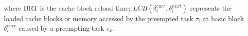 \noindent where BRT is the cache block reload time; \begin{math}\textit{LCB}(\delta_{i}^{curr},\delta_{i}^{next})\end{math} represents the loaded cache blocks or memory accessed by the preempted task \begin{math}\tau_{i}\end{math} at basic block \begin{math}\delta_{i}^{curr}\end{math} caused by a preempting task \begin{math}\tau_{k}\end{math}.
